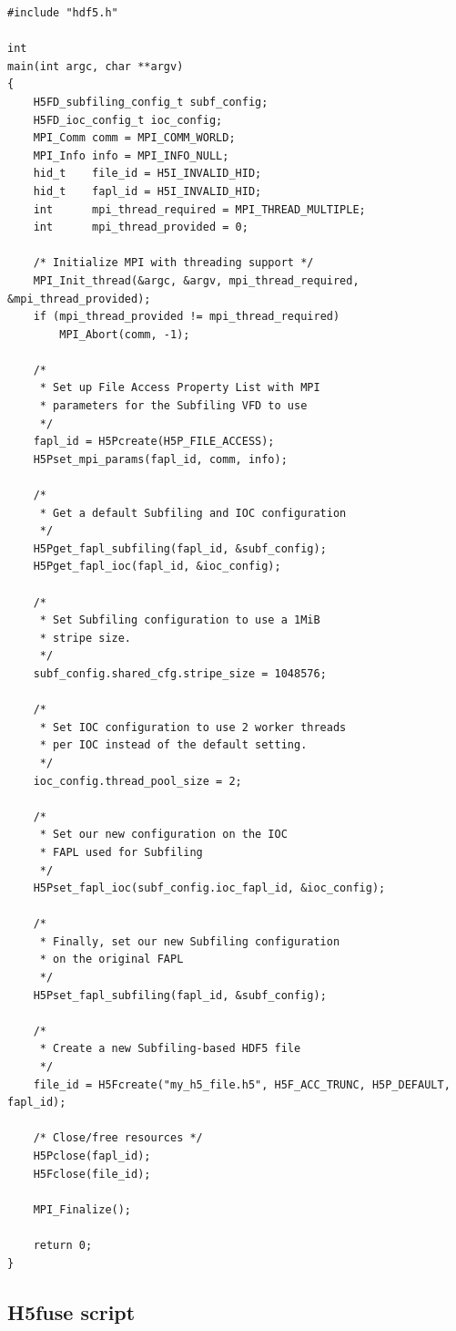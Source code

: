 \documentclass[../main.tex]{subfiles}
\begin{document}
\label{ex:ex2}
\begin{verbatim}
#include "hdf5.h"

int
main(int argc, char **argv)
{
    H5FD_subfiling_config_t subf_config;
    H5FD_ioc_config_t ioc_config;
    MPI_Comm comm = MPI_COMM_WORLD;
    MPI_Info info = MPI_INFO_NULL;
    hid_t    file_id = H5I_INVALID_HID;
    hid_t    fapl_id = H5I_INVALID_HID;
    int      mpi_thread_required = MPI_THREAD_MULTIPLE;
    int      mpi_thread_provided = 0;

    /* Initialize MPI with threading support */
    MPI_Init_thread(&argc, &argv, mpi_thread_required, &mpi_thread_provided);
    if (mpi_thread_provided != mpi_thread_required)
        MPI_Abort(comm, -1);

    /*
     * Set up File Access Property List with MPI
     * parameters for the Subfiling VFD to use
     */
    fapl_id = H5Pcreate(H5P_FILE_ACCESS);
    H5Pset_mpi_params(fapl_id, comm, info);

    /*
     * Get a default Subfiling and IOC configuration
     */
    H5Pget_fapl_subfiling(fapl_id, &subf_config);
    H5Pget_fapl_ioc(fapl_id, &ioc_config);

    /*
     * Set Subfiling configuration to use a 1MiB
     * stripe size.
     */
    subf_config.shared_cfg.stripe_size = 1048576;

    /*
     * Set IOC configuration to use 2 worker threads
     * per IOC instead of the default setting.
     */
    ioc_config.thread_pool_size = 2;

    /*
     * Set our new configuration on the IOC
     * FAPL used for Subfiling
     */
    H5Pset_fapl_ioc(subf_config.ioc_fapl_id, &ioc_config);

    /*
     * Finally, set our new Subfiling configuration
     * on the original FAPL
     */
    H5Pset_fapl_subfiling(fapl_id, &subf_config);
    
    /*
     * Create a new Subfiling-based HDF5 file
     */
    file_id = H5Fcreate("my_h5_file.h5", H5F_ACC_TRUNC, H5P_DEFAULT, fapl_id);

    /* Close/free resources */
    H5Pclose(fapl_id);
    H5Fclose(file_id);

    MPI_Finalize();

    return 0;
}
\end{verbatim}

\subsection{H5fuse script}
\end{document}
